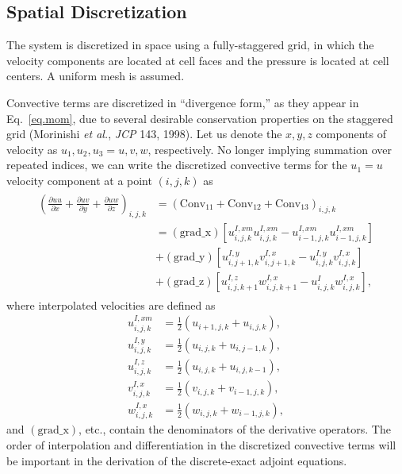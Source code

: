 \documentclass[letterpaper,10pt]{article}
\numberwithin{equation}{section}
\newcommand{\pp}[2]{\frac{\partial #1}{\partial #2}}
\begin{document}
\subsection{Spatial Discretization}

The system is discretized in space using a fully-staggered grid, in
which the velocity components are located at cell faces and the
pressure is located at cell centers. A uniform mesh is assumed.

Convective terms are discretized in ``divergence form,'' as they
appear in Eq.~\eqref{eq.mom}, due to several desirable conservation
properties on the staggered grid (Morinishi \textit{et al.},
\textit{JCP} 143, 1998). Let us denote the $x,y,z$ components of
velocity as $u_1,u_2,u_3=u,v,w$, respectively. No longer implying
summation over repeated indices, we can write the discretized
convective terms for the $u_1=u$ velocity component at a point
$(i,j,k)$ as
\begin{align}
  \begin{split}
  \left(\pp{uu}{x} + \pp{uv}{y} + \pp{uw}{z}\right)_{i,j,k} &=
  \left(\mathrm{Conv}_{11} + \mathrm{Conv}_{12} + \mathrm{Conv}_{13}\right)_{i,j,k} \\
  &= (\mathrm{grad\_x})\left[u_{i,j,k}^{I,xm}u_{i,j,k}^{I,xm} - u_{i-1,j,k}^{I,xm}u_{i-1,j,k}^{I,xm}\right] \\
  &+ (\mathrm{grad\_y})\left[u_{i,j+1,k}^{I,y}v_{i,j+1,k}^{I,x} - u_{i,j,k}^{I,y}v_{i,j,k}^{I,x}\right] \\
  &+ (\mathrm{grad\_z})\left[u_{i,j,k+1}^{I,z}w_{i,j,k+1}^{I,x} - u_{i,j,k}^Iw_{i,j,k}^{I,x}\right],
  \label{eq.forward_conv}
  \end{split}
\end{align}
where interpolated velocities are defined as
\begin{align*}
  u_{i,j,k}^{I,xm} &= \frac{1}{2}\left(u_{i+1,j,k} + u_{i,j,k}\right), \\
  u_{i,j,k}^{I,y} &= \frac{1}{2}\left(u_{i,j,k} + u_{i,j-1,k}\right), \\
  u_{i,j,k}^{I,z} &= \frac{1}{2}\left(u_{i,j,k} + u_{i,j,k-1}\right), \\
  v_{i,j,k}^{I,x} &= \frac{1}{2}\left(v_{i,j,k} + v_{i-1,j,k}\right), \\
  w_{i,j,k}^{I,x} &= \frac{1}{2}\left(w_{i,j,k} + w_{i-1,j,k}\right),
\end{align*}
and $(\mathrm{grad\_x})$, etc., contain the denominators of the
derivative operators. The order of interpolation and differentiation
in the discretized convective terms will be important in the
derivation of the discrete-exact adjoint equations.
\end{document}
